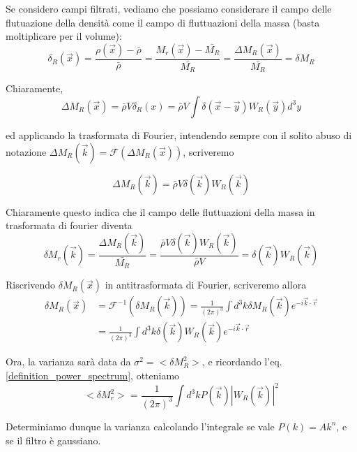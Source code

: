 \documentclass{report}
\begin{document}
Se considero campi filtrati, vediamo che possiamo considerare il campo delle flutuazione della densità come il campo di fluttuazioni della massa (basta moltiplicare per il volume):
\begin{equation}
    \delta_R(\vec {x} ) = \frac{\rho(\vec{x})- \bar{\rho}}{\bar{\rho}} = \frac{M_r(\vec{x}) - \bar{M_R}}{\bar{M_R}} = \frac{\Delta M_R(\vec{x})}{\bar{M_R}} = \delta M_R 
\end{equation}

Chiaramente, 
\begin{equation}
    \Delta M_R(\vec{x}) = \bar{\rho}V \delta_R(x) = \bar{\rho}V\int \delta(\vec{x} - \vec{y})W_R(\vec{y})d^3y
\end{equation}

ed applicando la trasformata di Fourier, intendendo sempre con il solito abuso di notazione $\Delta M_R(\vec{k}) = \mathcal{F}(\Delta M_R(\vec{x}))$, scriveremo

\begin{equation}
    \Delta M_R(\vec{k}) = \bar{\rho}V\delta(\vec{k})W_R(\vec{k})
\end{equation}

Chiaramente questo indica che il campo delle fluttuazioni della massa in trasformata di fourier diventa 
\begin{equation}
    \delta M_r(\vec{k}) = \frac{\Delta M_R(\vec{k})}{\bar{M_R}} = \frac{\bar{\rho}V\delta(\vec{k})W_R(\vec{k})}{\bar{\rho}V} = \delta(\vec{k})W_R(\vec{k})
\end{equation}

Riscrivendo $\delta M_R(\vec{x})$ in antitrasformata di Fourier, scriveremo allora
\begin{align}
    \delta M_R(\vec{x}) &= \mathcal{F^{-1}}(\delta M_R(\vec{k})) = \frac{1}{(2\pi)^3}\int d^3k \delta M_R(\vec{k}) e^{-i \vec{k}\cdot \vec{r}} \\
    &= \frac{1}{(2\pi)^3}\int d^3k \delta(\vec{k})W_R(\vec{k})e^{-i\vec{k}\cdot \vec{r}}
\end{align}

Ora, la varianza sarà data da $\sigma^2 = <\delta M_R^2>$, e ricordando l'eq. \ref{definition_power_spectrum}, otteniamo
\begin{equation}
    <\delta M_r^2> = \frac{1}{(2\pi)^3}\int d^3k P(\vec{k})|W_R(\vec{k})|^2
\end{equation}

Determiniamo dunque la varianza calcolando l'integrale se vale $P(k) = Ak^n$, e se il filtro è gaussiano. \\
\end{document}
